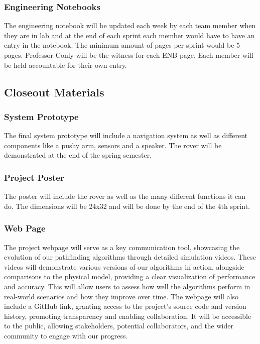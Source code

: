 \subsubsection{Engineering Notebooks}
The engineering notebook will be updated each week by each team member when they are in lab and at the end of each sprint each member would have to have an entry in the notebook. The minimum amount of pages per sprint would be 5 pages. Professor Conly will be the witness for each ENB page. Each member will be held accountable for their own entry.

\subsection{Closeout Materials}

\subsubsection{System Prototype}
The final system prototype will include a navigation system as well as different components like a pushy arm, sensors and a speaker. The rover will be demonstrated at the end of the spring semester.

\subsubsection{Project Poster}
The poster will include the rover as well as the many different functions it can do. The dimensions will be 24x32 and will be done by the end of the 4th sprint.

\subsubsection{Web Page}
The project webpage will serve as a key communication tool, showcasing the evolution of our pathfinding algorithms through detailed simulation videos. These videos will demonstrate various versions of our algorithms in action, alongside comparisons to the physical model, providing a clear visualization of performance and accuracy. This will allow users to assess how well the algorithms perform in real-world scenarios and how they improve over time. The webpage will also include a GitHub link, granting access to the project's source code and version history, promoting transparency and enabling collaboration. It will be accessible to the public, allowing stakeholders, potential collaborators, and the wider community to engage with our progress.


